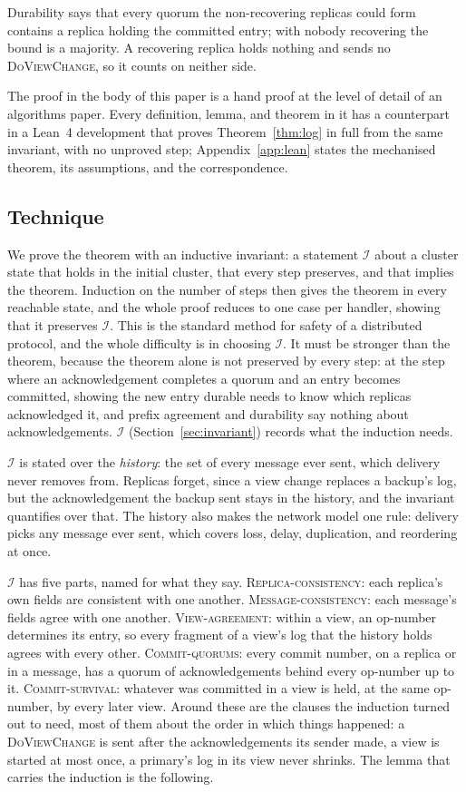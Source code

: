 \documentclass[11pt,a4paper]{article}
\theoremstyle{plain}
\theoremstyle{definition}
\theoremstyle{remark}
\newcommand{\msg}[1]{\textsc{#1}}
\newcommand{\dvc}{\msg{DoViewChange}}
\newcommand{\Inv}{\mathcal{I}}
\newcommand{\Local}{\textsc{Replica-consistency}}
\newcommand{\WellFormed}{\textsc{Message-consistency}}
\newcommand{\OneLog}{\textsc{View-agreement}}
\newcommand{\CommitsBacked}{\textsc{Commit-quorums}}
\newcommand{\Survival}{\textsc{Commit-survival}}
\begin{document}
Durability says that every quorum the non-recovering replicas could form
contains a replica holding the committed entry; with nobody recovering
the bound is a majority. A recovering replica holds nothing and sends
no \dvc{}, so it counts on neither side.

The proof in the body of this paper is a hand proof at the level of
detail of an algorithms paper. Every definition, lemma, and theorem in it
has a counterpart in a Lean~4 development that proves
Theorem~\ref{thm:log} in full from the same invariant, with no unproved
step; Appendix~\ref{app:lean} states the mechanised theorem, its
assumptions, and the correspondence.

\subsection{Technique}

We prove the theorem with an inductive invariant: a statement $\Inv$
about a cluster state that holds in the initial cluster, that every step
preserves, and that implies the theorem. Induction on the number of
steps then gives the theorem in every reachable state, and the whole
proof reduces to one case per handler, showing that it preserves
$\Inv$. This is the standard method for safety of a distributed
protocol, and the whole difficulty is in choosing $\Inv$. It must be
stronger than the theorem, because the theorem alone is not preserved by
every step: at the step where an acknowledgement completes a quorum and
an entry becomes committed, showing the new entry durable needs to know
which replicas acknowledged it, and prefix agreement and durability say
nothing about acknowledgements. $\Inv$ (Section~\ref{sec:invariant})
records what the induction needs.

$\Inv$ is stated over the \emph{history}: the set of every message ever
sent, which delivery never removes from. Replicas forget, since a view
change replaces a backup's log, but the acknowledgement the backup sent
stays in the history, and the invariant quantifies over that. The
history also makes the network model one rule: delivery picks any
message ever sent, which covers loss, delay, duplication, and reordering
at once.

$\Inv$ has five parts, named for what they say. \Local: each replica's
own fields are consistent with one another. \WellFormed: each message's
fields agree with one another. \OneLog: within a view, an op-number
determines its entry, so every fragment of a view's log that the history
holds agrees with every other. \CommitsBacked: every commit number, on a
replica or in a message, has a quorum of acknowledgements behind every
op-number up to it. \Survival: whatever was committed in a view is held,
at the same op-number, by every later view. Around these are the clauses
the induction turned out to need, most of them about the order in which
things happened: a \dvc{} is sent after the acknowledgements its
sender made, a view is started at most once, a primary's log in its view never
shrinks. The lemma that carries the induction is the following.
\end{document}
